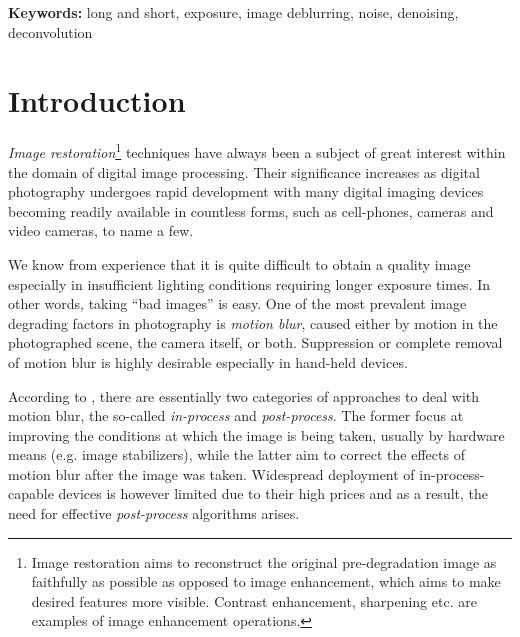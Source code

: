 \documentclass[12pt,notitlepage]{report}
\begin{document}
\noindent \textbf{Keywords:} long and short, exposure, image deblurring, noise, denoising, deconvolution

\clearpage


\addtolength{\parskip}{.5\baselineskip}

\chapter{Introduction}
\label{chap:introduction}

{\em Image restoration}\footnote[1]{Image restoration aims to reconstruct the original pre-degradation image as faithfully as possible as opposed to image enhancement, which aims to make desired features more visible. Contrast enhancement, sharpening etc. are examples of image enhancement operations.} techniques have always been a subject of great interest within the domain of digital image processing. Their significance increases as digital photography undergoes rapid development with many digital imaging devices becoming readily available in countless forms, such as cell-phones, cameras and video cameras, to name a few. 

We know from experience that it is quite difficult to obtain a quality image especially in insufficient lighting conditions requiring longer exposure times. In other words, taking “bad images” is easy. One of the most prevalent image degrading factors in photography is {\em motion blur}, caused either by motion in the photographed scene, the camera itself, or both. Suppression or complete removal of motion blur is highly desirable especially in hand-held devices.

According to \cite{jia04}, there are essentially two categories of approaches to deal with motion blur, the so-called {\em in-process} and {\em post-process}. The former focus at improving the conditions at which the image is being taken, usually by hardware means (e.g. image stabilizers), while the latter aim to correct the effects of motion blur after the image was taken. Widespread deployment of in-process-capable devices is however limited due to their high prices and as a result, the need for effective {\em post-process} algorithms arises.
\end{document}
